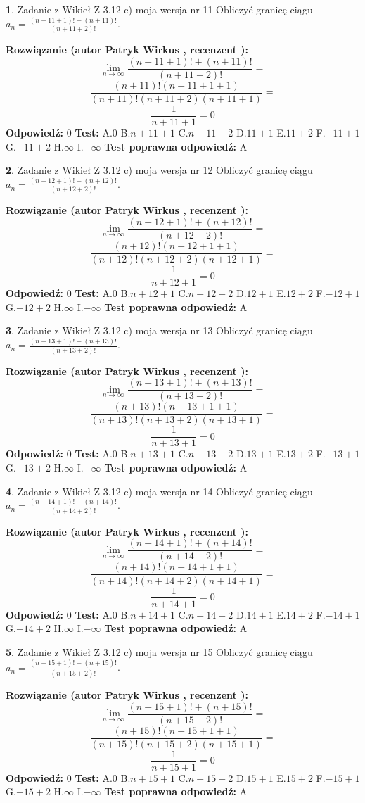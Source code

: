 \documentclass[12pt, a4paper]{article}
\theoremstyle{definition} %
\newtheorem{zad}{}
\newcommand{\zadStart}[1]{\begin{zad}#1\newline}
\newcommand{\zadStop}{\end{zad}}
\newcommand{\rozwStart}[2]{\noindent \textbf{Rozwiązanie (autor #1 , recenzent #2): }\newline}
\newcommand{\rozwStop}{\newline}
\newcommand{\odpStart}{\noindent \textbf{Odpowiedź:}\newline}
\newcommand{\odpStop}{\newline}
\newcommand{\testStart}{\noindent \textbf{Test:}\newline}
\newcommand{\testStop}{\newline}
\newcommand{\kluczStart}{\noindent \textbf{Test poprawna odpowiedź:}\newline}
\newcommand{\kluczStop}{\newline}
\begin{document}
\zadStart{Zadanie z Wikieł Z 3.12 c) moja wersja nr 11}
Obliczyć granicę ciągu $a_{n}=\frac{(n+11+1)!+(n+11)!}{(n+11+2)!}$.
\zadStop
\rozwStart{Patryk Wirkus}{}
$$\lim\limits_{n\to\infty}\frac{(n+11+1)!+(n+11)!}{(n+11+2)!}=$$
$$\frac{(n+11)!(n+11+1+1)}{(n+11)!(n+11+2)(n+11+1)}=$$
$$\frac{1}{n+11+1}= 0$$
\rozwStop
\odpStart
$0$
\odpStop
\testStart
A.$0$
B.$n+11+1$
C.$n+11+2$
D.$11+1$
E.$11+2$
F.$-11+1$
G.$-11+2$
H.$\infty$
I.$-\infty$
\testStop
\kluczStart
A
\kluczStop



\zadStart{Zadanie z Wikieł Z 3.12 c) moja wersja nr 12}
Obliczyć granicę ciągu $a_{n}=\frac{(n+12+1)!+(n+12)!}{(n+12+2)!}$.
\zadStop
\rozwStart{Patryk Wirkus}{}
$$\lim\limits_{n\to\infty}\frac{(n+12+1)!+(n+12)!}{(n+12+2)!}=$$
$$\frac{(n+12)!(n+12+1+1)}{(n+12)!(n+12+2)(n+12+1)}=$$
$$\frac{1}{n+12+1}= 0$$
\rozwStop
\odpStart
$0$
\odpStop
\testStart
A.$0$
B.$n+12+1$
C.$n+12+2$
D.$12+1$
E.$12+2$
F.$-12+1$
G.$-12+2$
H.$\infty$
I.$-\infty$
\testStop
\kluczStart
A
\kluczStop



\zadStart{Zadanie z Wikieł Z 3.12 c) moja wersja nr 13}
Obliczyć granicę ciągu $a_{n}=\frac{(n+13+1)!+(n+13)!}{(n+13+2)!}$.
\zadStop
\rozwStart{Patryk Wirkus}{}
$$\lim\limits_{n\to\infty}\frac{(n+13+1)!+(n+13)!}{(n+13+2)!}=$$
$$\frac{(n+13)!(n+13+1+1)}{(n+13)!(n+13+2)(n+13+1)}=$$
$$\frac{1}{n+13+1}= 0$$
\rozwStop
\odpStart
$0$
\odpStop
\testStart
A.$0$
B.$n+13+1$
C.$n+13+2$
D.$13+1$
E.$13+2$
F.$-13+1$
G.$-13+2$
H.$\infty$
I.$-\infty$
\testStop
\kluczStart
A
\kluczStop



\zadStart{Zadanie z Wikieł Z 3.12 c) moja wersja nr 14}
Obliczyć granicę ciągu $a_{n}=\frac{(n+14+1)!+(n+14)!}{(n+14+2)!}$.
\zadStop
\rozwStart{Patryk Wirkus}{}
$$\lim\limits_{n\to\infty}\frac{(n+14+1)!+(n+14)!}{(n+14+2)!}=$$
$$\frac{(n+14)!(n+14+1+1)}{(n+14)!(n+14+2)(n+14+1)}=$$
$$\frac{1}{n+14+1}= 0$$
\rozwStop
\odpStart
$0$
\odpStop
\testStart
A.$0$
B.$n+14+1$
C.$n+14+2$
D.$14+1$
E.$14+2$
F.$-14+1$
G.$-14+2$
H.$\infty$
I.$-\infty$
\testStop
\kluczStart
A
\kluczStop



\zadStart{Zadanie z Wikieł Z 3.12 c) moja wersja nr 15}
Obliczyć granicę ciągu $a_{n}=\frac{(n+15+1)!+(n+15)!}{(n+15+2)!}$.
\zadStop
\rozwStart{Patryk Wirkus}{}
$$\lim\limits_{n\to\infty}\frac{(n+15+1)!+(n+15)!}{(n+15+2)!}=$$
$$\frac{(n+15)!(n+15+1+1)}{(n+15)!(n+15+2)(n+15+1)}=$$
$$\frac{1}{n+15+1}= 0$$
\rozwStop
\odpStart
$0$
\odpStop
\testStart
A.$0$
B.$n+15+1$
C.$n+15+2$
D.$15+1$
E.$15+2$
F.$-15+1$
G.$-15+2$
H.$\infty$
I.$-\infty$
\testStop
\kluczStart
A
\kluczStop
\end{document}
